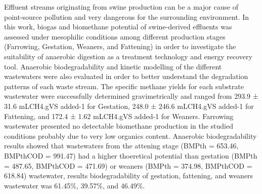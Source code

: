 Effluent streams originating from swine production can be a major cause of point-source pollution and very dangerous for the surrounding environment. In this work, biogas and biomethane potential of swine-derived effluents was assessed under mesophilic conditions among different production stages (Farrowing, Gestation, Weaners, and Fattening) in order to investigate the suitability of anaerobic digestion as a treatment technology and energy recovery tool. Anaerobic biodegradability and kinetic modelling of the different wastewaters were also evaluated in order to better understand the degradation patterns of each waste stream. The specific methane yields for each substrate wastewater were successfully determined gravimetrically and ranged from 293.9 ± 31.6 mLCH4.gVS added-1 for Gestation, 248.0 ± 246.6 mLCH4.gVS added-1 for Fattening, and 172.4 ± 1.62 mLCH4.gVS added-1 for Weaners. Farrowing wastewater presented no detectable biomethane production in the studied conditions probably due to very low organics content.  Anaerobic biodegradability results showed that wastewaters from the attening stage (BMPth = 653.46, BMPthCOD = 991.47) had a higher thoeretical potential than gestation (BMPth = 487.65, BMPthCOD = 471.69) or weaners (BMPth = 374.98, BMPthCOD = 618.84) wastewater, results  biodegradability of gestation, fattening, and weaners wastewater was 61.45\%, 39.57\%, and 46.49\%.
